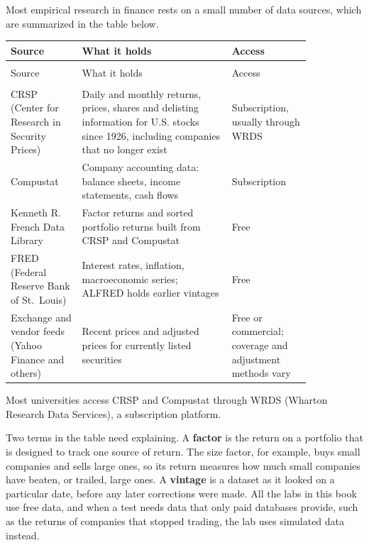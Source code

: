 Most empirical research in finance rests on a small number of data sources, which are summarized in the table below.

\begingroup
\small
\setlength{\LTpre}{6pt}\setlength{\LTpost}{6pt}
\begin{longtable}{@{}>{\raggedright\arraybackslash}p{0.2\linewidth}>{\raggedright\arraybackslash}p{0.42\linewidth}>{\raggedright\arraybackslash}p{0.22\linewidth}@{}}
\toprule
Source & What it holds & Access \\
\midrule
\endfirsthead
\multicolumn{3}{@{}l}{\emph{(continued)}}\\
\toprule
Source & What it holds & Access \\
\midrule
\endhead
\midrule
\multicolumn{3}{r@{}}{\emph{continued on next page}}\\
\endfoot
\bottomrule
\endlastfoot
CRSP (Center for Research in Security Prices) & Daily and monthly returns, prices, shares and delisting information for U.S. stocks since 1926, including companies that no longer exist & Subscription, usually through WRDS \\
Compustat & Company accounting data: balance sheets, income statements, cash flows & Subscription \\
Kenneth R. French Data Library & Factor returns and sorted portfolio returns built from CRSP and Compustat & Free \\
FRED (Federal Reserve Bank of St.\ Louis) & Interest rates, inflation, macroeconomic series; ALFRED holds earlier vintages & Free \\
Exchange and vendor feeds (Yahoo Finance and others) & Recent prices and adjusted prices for currently listed securities & Free or commercial; coverage and adjustment methods vary \\
\end{longtable}
\endgroup

Most universities access CRSP and Compustat through WRDS (Wharton Research Data Services), a subscription platform.

Two terms in the table need explaining. A \textbf{factor} is the return on a portfolio that is designed to track one source of return. The size factor, for example, buys small companies and sells large ones, so its return measures how much small companies have beaten, or trailed, large ones. A \textbf{vintage} is a dataset as it looked on a particular date, before any later corrections were made. All the labs in this book use free data, and when a test needs data that only paid databases provide, such as the returns of companies that stopped trading, the lab uses simulated data instead.

